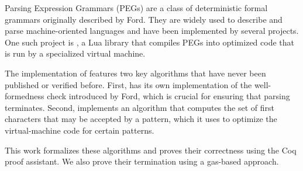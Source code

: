 Parsing Expression Grammars (PEGs)
are a class of deterministic formal grammars
originally described by Ford.
They are widely used to describe and parse machine-oriented languages
and have been implemented by several projects.
One such project is \lpeg{},
a Lua library that compiles PEGs into optimized code
that is run by a specialized virtual machine.

The implementation of \lpeg{} features two key algorithms
that have never been published or verified before.
First, \lpeg{} has its own implementation of
the well-formedness check introduced by Ford,
which is crucial for ensuring that parsing terminates.
Second, \lpeg{} implements an algorithm
that computes the set of first characters
that may be accepted by a pattern,
which it uses to optimize
the virtual-machine code for certain patterns.

This work formalizes these algorithms
and proves their correctness
using the Coq proof assistant.
We also prove their termination
using a gas-based approach.